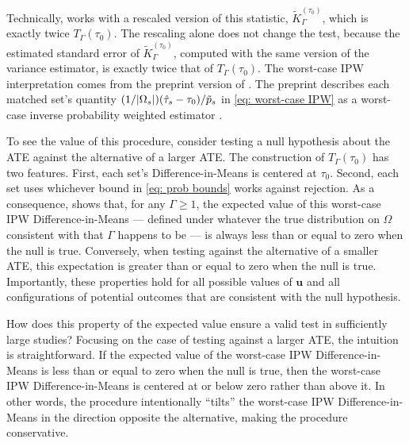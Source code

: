 \documentclass[twoside,11pt]{article}
\DeclarePairedDelimiter\abs{\lvert}{\rvert}
\begin{document}
Technically, \citet[Section~4.1]{fogarty2023} works with a rescaled
version of this statistic, \(\tilde{K}_{\Gamma}^{(\tau_0)}\), which is
exactly twice \(T_{\Gamma}(\tau_0)\). The rescaling alone does not change
the test, because the estimated standard error of
\(\tilde{K}_{\Gamma}^{(\tau_0)}\), computed with the same version of the
variance estimator, is exactly twice that of \(T_{\Gamma}(\tau_0)\). The
worst-case IPW interpretation comes from the preprint version of
\citet{fogarty2023}. The preprint describes each matched set's quantity
\((1/\abs{\Omega_s})(\hat{\tau}_s - \tau_0)/\tilde{p}_s\) in
\eqref{eq: worst-case IPW} as a worst-case inverse probability weighted
estimator \citep[Sections~5.2--5.4]{fogarty2020arxiv}.

To see the value of this procedure, consider testing a null hypothesis
about the ATE against the alternative of a larger ATE. The construction
of \(T_{\Gamma}(\tau_0)\) has two features. First, each set's
Difference-in-Means is centered at \(\tau_0\). Second, each set uses
whichever bound in \eqref{eq: prob bounds} works against rejection. As
a consequence, \citet[Section~4.1 and Lemma~3]{fogarty2023} shows that, for any \(\Gamma \geq 1\), the expected
value of this worst-case IPW Difference-in-Means --- defined under
whatever the true distribution on \(\Omega\) consistent with that
\(\Gamma\) happens to be --- is always less than or equal to zero
when the null is true.
Conversely, when testing against the alternative of a
smaller ATE, this expectation is greater than or equal to zero when
the null is true. Importantly, these properties hold for all possible values
of \(\bm{u}\) and all configurations of potential outcomes that are
consistent with the null hypothesis.

How does this property of the expected value ensure a valid test in
sufficiently large studies? Focusing on the case of testing against a
larger ATE, the intuition is straightforward. If the expected value of
the worst-case IPW Difference-in-Means is less than or equal to zero
when the null is true, then the worst-case IPW Difference-in-Means is
centered at or below zero rather than above it. In other words, the
procedure intentionally ``tilts'' the worst-case IPW Difference-in-Means
in the direction opposite the alternative, making the procedure
conservative.
\end{document}
